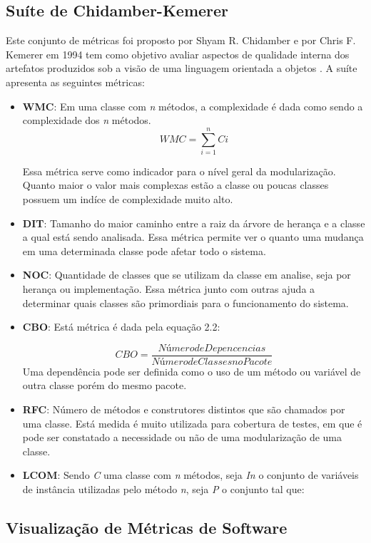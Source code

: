 \subsection{Suíte de Chidamber-Kemerer}
Este conjunto de métricas foi proposto por Shyam R. Chidamber e por Chris F. Kemerer em 1994 tem como objetivo avaliar aspectos de qualidade interna dos artefatos produzidos sob a visão de uma linguagem orientada a objetos \cite{chidamber}. A suíte apresenta as seguintes métricas:
\begin{itemize}

\item \textbf{WMC}: Em uma classe com \textit{n} métodos, a complexidade é dada como sendo a complexidade dos \textit{n} métodos. 
 \begin{equation}
WMC = \sum_{i=1}^{n}Ci
\end{equation}


Essa métrica serve como indicador para o nível geral da modularização. Quanto maior o valor mais complexas estão a classe ou poucas classes possuem um indíce de complexidade muito alto.

\item \textbf{DIT}: Tamanho do maior caminho entre a raiz da árvore de herança e a classe a qual está sendo analisada. Essa métrica permite ver o quanto uma mudança em uma determinada classe pode afetar todo o sistema.

\item \textbf{NOC}: Quantidade de classes que se utilizam da classe em analise, seja por herança ou implementação. Essa métrica junto com outras ajuda a determinar quais classes são primordiais para o funcionamento do sistema.

\item \textbf{CBO}: Está métrica é dada pela equação 2.2: 

\begin{equation}
CBO = \frac{Número de Depencencias}{Número de Classes no Pacote}
\end{equation}
Uma dependência pode ser definida como o uso de um método ou variável de outra classe porém do mesmo pacote.

\item \textbf{RFC}: Número de métodos e construtores distintos que são chamados por uma classe. Está medida é muito utilizada para cobertura de testes, em que é pode ser constatado a necessidade ou não de uma modularização de uma classe.

\item \textbf{LCOM}: Sendo \textit{C} uma classe com \textit{n} métodos, seja \textit{In} o conjunto de variáveis de instância utilizadas pelo método \textit{n}, seja \textit{P} o conjunto tal que:

\end{itemize}

\subsection{Visualização de Métricas de Software}
